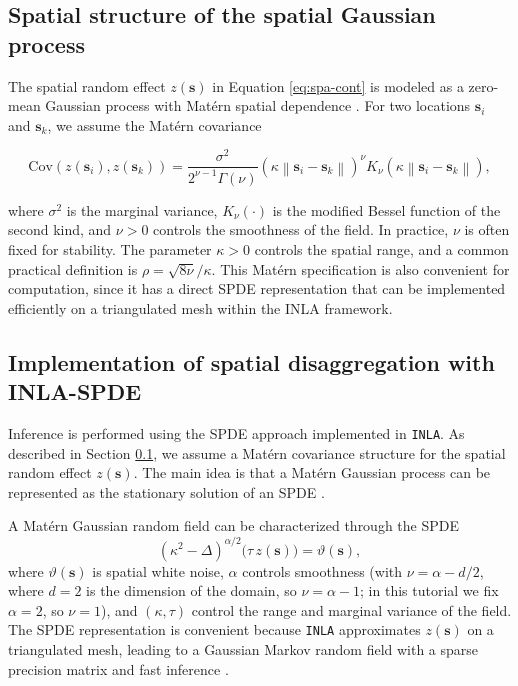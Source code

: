 \subsection{Spatial structure of the spatial Gaussian process}\label{sec:spa-matern}

The spatial random effect \(z(\mathbf{s})\) in Equation \eqref{eq:spa-cont} is modeled as a zero-mean Gaussian process with Matérn spatial dependence \citep{matern_1960}. For two locations \(\mathbf{s}_i\) and \(\mathbf{s}_k\), we assume the Matérn covariance

\begin{equation}
\text{Cov}(z(\mathbf{s}_i), z(\mathbf{s}_k)) =
\frac{\sigma^{2}}{2^{\nu-1}\Gamma(\nu)}
\left(\kappa\left\|\mathbf{s}_i-\mathbf{s}_k\right\|\right)^{\nu}
K_{\nu}\left(\kappa\left\|\mathbf{s}_i-\mathbf{s}_k\right\|\right),
\label{eq:matern}
\end{equation}

where \(\sigma^{2}\) is the marginal variance, \(K_{\nu}(\cdot)\) is the modified Bessel function of the second kind, and \(\nu>0\) controls the smoothness of the field. In practice, \(\nu\) is often fixed for stability. The parameter \(\kappa>0\) controls the spatial range, and a common practical definition is \(\rho = \sqrt{8\nu}/\kappa\). This Matérn specification is also convenient for computation, since it has a direct SPDE representation that can be implemented efficiently on a triangulated mesh within the INLA framework.

\subsection{Implementation of spatial disaggregation with INLA-SPDE}\label{sec:inla-inf-spa}

Inference is performed using the SPDE approach implemented in \texttt{INLA}. As described in Section \ref{sec:spa-matern}, we assume a Matérn covariance structure for the spatial random effect \(z(\mathbf{s})\). The main idea is that a Matérn Gaussian process can be represented as the stationary solution of an SPDE \citep{whittle1963stochastic}.

A Matérn Gaussian random field can be characterized through the SPDE
\begin{equation}
\left(\kappa^2-\Delta\right)^{\alpha / 2}\big(\tau\,z(\mathbf{s})\big)=\vartheta(\mathbf{s}),
\label{eq:spde}
\end{equation}
where \(\vartheta(\mathbf{s})\) is spatial white noise, \(\alpha\) controls smoothness (with \(\nu=\alpha-d/2\), where \(d=2\) is the dimension of the domain, so \(\nu=\alpha-1\); in this tutorial we fix \(\alpha=2\), so \(\nu=1\)), and \((\kappa,\tau)\) control the range and marginal variance of the field. The SPDE representation is convenient because \texttt{INLA} approximates \(z(\mathbf{s})\) on a triangulated mesh, leading to a Gaussian Markov random field with a sparse precision matrix and fast inference \citep{rue_et_al_r_inla_2009}.

